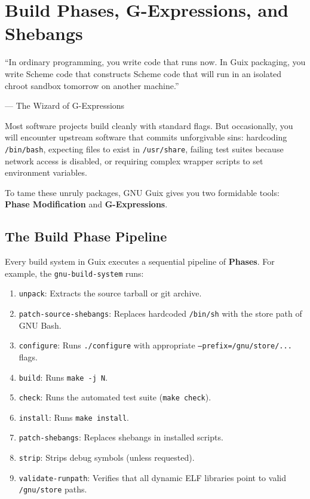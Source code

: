 \chapter{Build Phases, G-Expressions, and Shebangs}
\label{chap:phases-and-gexp}

\epigraph{``In ordinary programming, you write code that runs now. In Guix packaging, you write Scheme code that constructs Scheme code that will run in an isolated chroot sandbox tomorrow on another machine.''}{--- The Wizard of G-Expressions}

\noindent
Most software projects build cleanly with standard flags. But occasionally, you will encounter upstream software that commits unforgivable sins: hardcoding \texttt{/bin/bash}, expecting files to exist in \texttt{/usr/share}, failing test suites because network access is disabled, or requiring complex wrapper scripts to set environment variables.

To tame these unruly packages, GNU Guix gives you two formidable tools: \textbf{Phase Modification} and \textbf{G-Expressions}.

\section{The Build Phase Pipeline}

Every build system in Guix executes a sequential pipeline of \textbf{Phases}. For example, the \texttt{gnu-build-system} runs:

\begin{enumerate}
  \item \texttt{unpack}: Extracts the source tarball or git archive.
  \item \texttt{patch-source-shebangs}: Replaces hardcoded \texttt{/bin/sh} with the store path of GNU Bash.
  \item \texttt{configure}: Runs \texttt{./configure} with appropriate \texttt{--prefix=/gnu/store/...} flags.
  \item \texttt{build}: Runs \texttt{make -j N}.
  \item \texttt{check}: Runs the automated test suite (\texttt{make check}).
  \item \texttt{install}: Runs \texttt{make install}.
  \item \texttt{patch-shebangs}: Replaces shebangs in installed scripts.
  \item \texttt{strip}: Strips debug symbols (unless requested).
  \item \texttt{validate-runpath}: Verifies that all dynamic ELF libraries point to valid \texttt{/gnu/store} paths.
\end{enumerate}

